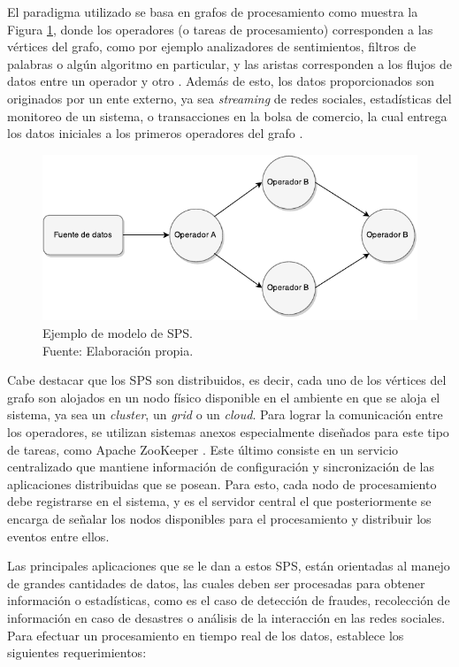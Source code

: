 El paradigma utilizado se basa en grafos de procesamiento como muestra la Figura \ref{fig:grafo}, donde los operadores (o tareas de procesamiento) corresponden a las v\'ertices del grafo, como por ejemplo analizadores de sentimientos, filtros de palabras o alg\'un algoritmo en particular, y las aristas corresponden a los flujos de datos entre un operador y otro \citep{Shahrivari14}. Adem\'as de esto, los datos proporcionados son originados por un ente externo, ya sea \textit{streaming} de redes sociales, estad\'isticas del monitoreo de un sistema, o transacciones en la bolsa de comercio, la cual entrega los datos iniciales a los primeros operadores del grafo \citep{AppelFFB12}.

\begin{figure}[ht!]
  \centering
    \includegraphics[scale=1]{images/SPS.pdf}
  \caption[Ejemplo de modelo de SPS.]{Ejemplo de modelo de SPS.\\Fuente: Elaboración propia.}
  \label{fig:grafo}
\end{figure}

Cabe destacar que los SPS son distribuidos, es decir, cada uno de los v\'ertices del grafo son alojados en un nodo f\'isico disponible en el ambiente en que se aloja el sistema, ya sea un \textit{cluster}, un \textit{grid} o un \textit{cloud}. Para lograr la comunicaci\'on entre los operadores, se utilizan sistemas anexos especialmente dise\~nados para este tipo de tareas, como Apache ZooKeeper \citep{HuntKJR10}. Este \'ultimo consiste en un servicio centralizado que mantiene informaci\'on de configuraci\'on y sincronizaci\'on de las aplicaciones distribuidas que se posean. \normalsize{Para esto, cada nodo de procesamiento debe registrarse en el sistema, y es el servidor central el que posteriormente se encarga de se\~nalar los nodos disponibles para el procesamiento y distribuir los eventos entre ellos.}

Las principales aplicaciones que se le dan a estos SPS, est\'an orientadas al manejo de grandes cantidades de datos, las cuales deben ser procesadas para obtener informaci\'on o estad\'isticas, como es el caso de detecci\'on de fraudes, recolecci\'on de informaci\'on en caso de desastres o an\'alisis de la interacci\'on en las redes sociales. Para efectuar un procesamiento en tiempo real de los datos, \citep{StonebrakerCZ05} establece los siguientes requerimientos:

